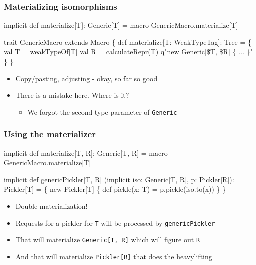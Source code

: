 \documentclass[svgnames,hyperref={bookmarks=false}]{beamer}
\begin{document}
\begin{frame}[t, fragile]
\frametitle{Materializing isomorphisms}

\begin{semiverbatim}
implicit def materialize[T\only<2>{\alert{, R}}]: Generic[T] =
  macro GenericMacro.materialize[T]

trait GenericMacro extends Macro \{
  def materialize[T: WeakTypeTag]: Tree = \{
    val T = weakTypeOf[T]
    val R = calculateRepr(T)
    q"new Generic[\$T, \$R] \{ ... \}"
  \}
\}

\end{semiverbatim}

\begin{itemize}
\item Copy/pasting, adjusting - okay, so far so good
\item There is a mistake here. Where is it?
\pause
\begin{itemize}
\item We forgot the second type parameter of \texttt{Generic}
\end{itemize}
\end{itemize}
\end{frame}

\begin{frame}[t, fragile]
\frametitle{Using the materializer}

\begin{semiverbatim}
implicit def materialize[T, R]: Generic[T, R] =
  macro GenericMacro.materialize[T]

implicit def genericPickler[T, R]
  (implicit iso: Generic[T, R],
            p: Pickler[R]): Pickler[T] = \{
  new Pickler[T] \{
    def pickle(x: T) = p.pickle(iso.to(x))
  \}
\}

\end{semiverbatim}

\begin{itemize}
\item Double materialization!
\item Requests for a pickler for \texttt{T} will be processed by \texttt{genericPickler}
\item That will materialize \texttt{Generic[T, R]} which will figure out \texttt{R}
\item And that will materialize \texttt{Pickler[R]} that does the heavylifting
\end{itemize}
\end{frame}
\end{document}
